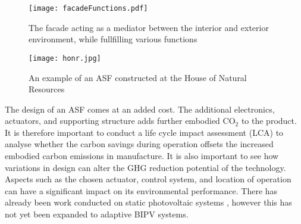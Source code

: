 


\begin{figure}[H]
\begin{center}
\texttt{[image: facadeFunctions.pdf]}
\caption{The facade acting as a mediator between the interior and exterior environment, while fullfilling various functions \cite{nagy2015frontiers}}
\label{fig:ASFschematic}
\end{center}
\end{figure}

\begin{figure}[H]
\begin{center}
\texttt{[image: honr.jpg]}
\caption{An example of an ASF constructed at the House of Natural Resources \cite{nagy2015frontiers}}
\label{fig:HoNR}
\end{center}
\end{figure}

The design of an ASF comes at an added cost. The additional electronics, actuators, and supporting structure adds further embodied CO$_2$ to the product. It is therefore important to conduct a life cycle impact assessment (LCA) to analyse whether the carbon savings during operation offsets the increased embodied carbon emissions in manufacture. It is also important to see how variations in design can alter the GHG reduction potential of the technology. Aspects such as the chosen actuator, control system, and location of operation can have a significant impact on its environmental performance. There has already been work conducted on static photovoltaic systems \cite{raugei2007life}, however this has not yet been expanded to adaptive BIPV systems. \\

